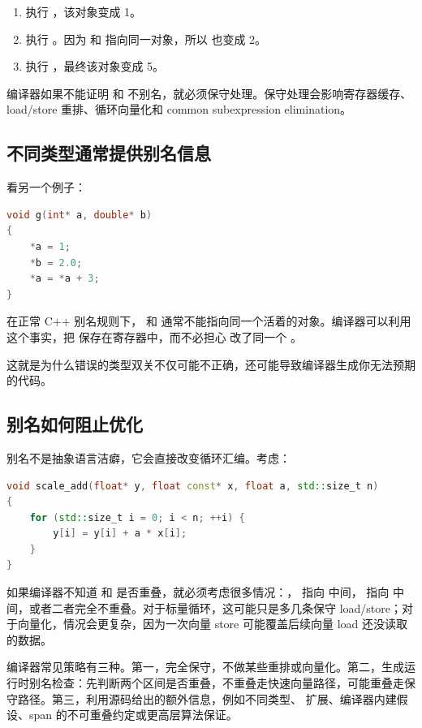 \begin{enumerate}
  \item 执行 ，该对象变成 1。
  \item 执行 。因为  和  指向同一对象，所以  也变成 2。
  \item 执行 ，最终该对象变成 5。
\end{enumerate}

编译器如果不能证明  和  不别名，就必须保守处理。保守处理会影响寄存器缓存、load/store 重排、循环向量化和 common subexpression elimination。

\subsection{不同类型通常提供别名信息}

看另一个例子：

\begin{lstlisting}[language=C++]
void g(int* a, double* b)
{
    *a = 1;
    *b = 2.0;
    *a = *a + 3;
}
\end{lstlisting}

在正常 C++ 别名规则下， 和  通常不能指向同一个活着的对象。编译器可以利用这个事实，把  保存在寄存器中，而不必担心  改了同一个 。

这就是为什么错误的类型双关不仅可能不正确，还可能导致编译器生成你无法预期的代码。

\subsection{别名如何阻止优化}

别名不是抽象语言洁癖，它会直接改变循环汇编。考虑：

\begin{lstlisting}[language=C++]
void scale_add(float* y, float const* x, float a, std::size_t n)
{
    for (std::size_t i = 0; i < n; ++i) {
        y[i] = y[i] + a * x[i];
    }
}
\end{lstlisting}

如果编译器不知道  和  是否重叠，就必须考虑很多情况：， 指向  中间， 指向  中间，或者二者完全不重叠。对于标量循环，这可能只是多几条保守 load/store；对于向量化，情况会更复杂，因为一次向量 store 可能覆盖后续向量 load 还没读取的数据。

编译器常见策略有三种。第一，完全保守，不做某些重排或向量化。第二，生成运行时别名检查：先判断两个区间是否重叠，不重叠走快速向量路径，可能重叠走保守路径。第三，利用源码给出的额外信息，例如不同类型、 扩展、编译器内建假设、span 的不可重叠约定或更高层算法保证。

